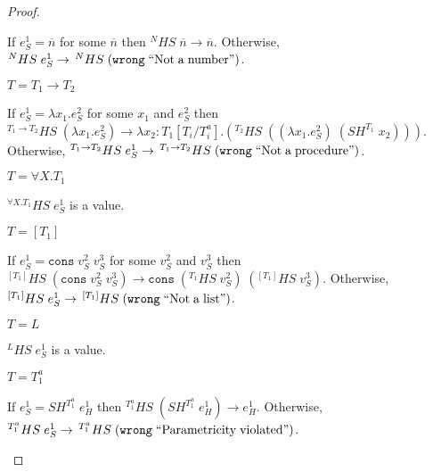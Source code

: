 \begin{theorem}
\begin{proof}
\begin{case}
\begin{case}
If $e_{S}^{1}=\overline{n}$ for some $\overline{n}$ then $^{N}HS\;\overline{n}\rightarrow\overline{n}$.  Otherwise, $^{N}HS\;e_{S}^{1}\rightarrow\,^{N}HS\;(\mathtt{wrong}\;\mathrm{``Not\;a\;number"})$.
\end{case}
\begin{case}
$T=T_{1}\rightarrow T_{2}$

If $e_{S}^{1}=\lambda x_{1}.e_{S}^{2}$ for some $x_{1}$ and $e_{S}^{2}$ then $^{T_{1}\rightarrow T_{2}}HS\;(\lambda x_{1}.e_{S}^{2})\rightarrow\lambda x_{2}:T_{1}[T_{i}/T^{a}_{i}].(^{T_{2}}HS\;((\lambda x_{1}.e_{S}^{2})\;(SH^{T_{1}}\;x_{2})))$.  Otherwise, $^{T_{1}\rightarrow T_{2}}HS\;e_{S}^{1}\rightarrow\,^{T_{1}\rightarrow T_{2}}HS\;(\mathtt{wrong}\;\mathrm{``Not\;a\;procedure"})$.
\end{case}
\begin{case}
$T=\forall X.T_{1}$

$^{\forall X.T_{1}}HS\;e_{S}^{1}$ is a value.
\end{case}
\begin{case}
$T=[T_{1}]$

If $e_{S}^{1}=\mathtt{cons}\;v_{S}^{2}\;v_{S}^{3}$ for some $v_{S}^{2}$ and $v_{S}^{3}$ then $^{[T_{1}]}HS\;(\mathtt{cons}\;v_{S}^{2}\;v_{S}^{3})\rightarrow\mathtt{cons}\;(^{T_{1}}HS\;v_{S}^{2})\;(^{[T_{1}]}HS\;v_{S}^{3})$.  Otherwise, $^{[T_{1}]}HS\;e_{S}^{1}\rightarrow\,^{[T_{1}]}HS\;(\mathtt{wrong}\;\mathrm{``Not\;a\;list"})$.
\end{case}
\begin{case}
$T=L$

$^{L}HS\;e_{S}^{1}$ is a value.
\end{case}
\begin{case}
$T=T_{1}^{a}$

If $e_{S}^{1}=SH^{T_{1}^{a}}\;e_{H}^{1}$ then $^{T_{1}^{a}}HS\;(SH^{T_{1}^{a}}\;e_{H}^{1})\rightarrow e_{H}^{1}$.  Otherwise, $^{T_{1}^{a}}HS\;e_{S}^{1}\rightarrow\,^{T_{1}^{a}}HS\;(\mathtt{wrong}\;\mathrm{``Parametricity\;violated"})$.
\end{case}
\end{case}
\end{proof}
\end{theorem}